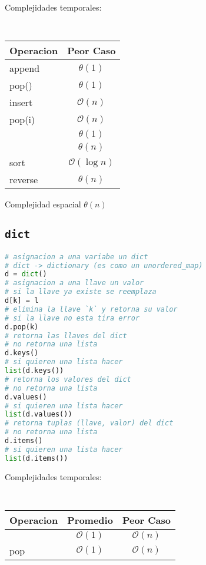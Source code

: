 \documentclass{article}
\newcommand{\bigO}{\mathcal{O}}
\begin{document}
\begin{multicols}{2}
Complejidades temporales:
\begin{table}[H]
  \tt \scriptsize
  \begin{center}
    \begin{tabular}[c]{l|c}
      \hline
      Operacion & Peor Caso \\
      \hline
      append & $\theta(1)$ \\
      \hline
      pop() & $\theta(1)$ \\
      \hline
      insert & $\bigO(n)$ \\
      \hline
      pop(i) & $\bigO(n)$ \\
      \hline
      [i] & $\theta(1)$\\
      \hline
      [i:j] & $\theta(n)$\\
      \hline
      sort & $\bigO(\log n)$ \\
      \hline
      reverse & $\theta(n)$\\
    \end{tabular}
  \end{center}
\end{table}

Complejidad espacial $\theta(n)$

\subsection*{\tt \footnotesize dict}
\begin{lstlisting}[language=Python]
# asignacion a una variabe un dict
# dict -> dictionary (es como un unordered_map)
d = dict()
# asignacion a una llave un valor
# si la llave ya existe se reemplaza
d[k] = l 
# elimina la llave `k` y retorna su valor
# si la llave no esta tira error
d.pop(k)
# retorna las llaves del dict
# no retorna una lista
d.keys()
# si quieren una lista hacer
list(d.keys())
# retorna los valores del dict
# no retorna una lista
d.values()
# si quieren una lista hacer
list(d.values())
# retorna tuplas (llave, valor) del dict
# no retorna una lista
d.items()
# si quieren una lista hacer
list(d.items())
\end{lstlisting}

Complejidades temporales:
\begin{table}[H]
  \tt \scriptsize
  \begin{center}
    \begin{tabular}[c]{l|c|c}
      \hline
      Operacion & Promedio & Peor Caso\\
      \hline
      [k] & $\bigO(1)$ & $\bigO(n)$ \\
      \hline
      pop & $\bigO(1)$ & $\bigO(n)$\\
      \hline
    \end{tabular}
  \end{center}
\end{table}
\end{multicols}
\end{document}
